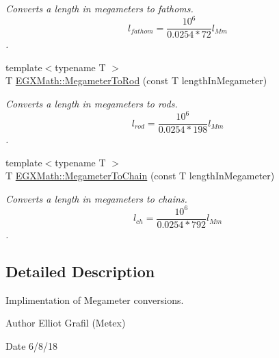 \begin{DoxyCompactItemize}
\begin{DoxyCompactList}\small\item\em Converts a length in megameters to fathoms. \[ l_{fathom}= \frac{10^{6}}{0.0254 * 72} l_{Mm} \]. \end{DoxyCompactList}\item 
{\footnotesize template$<$typename T $>$ }\\T \mbox{\hyperlink{group___e_g_x_math-_conversions-_length_conversions-_s_i-_megameter-_surveyors_ga46cf50c3f1310663facf0befbf3d71fb}{E\+G\+X\+Math\+::\+Megameter\+To\+Rod}} (const T length\+In\+Megameter)
\begin{DoxyCompactList}\small\item\em Converts a length in megameters to rods. \[ l_{rod}= \frac{10^{6}}{0.0254 * 198} l_{Mm} \]. \end{DoxyCompactList}\item 
{\footnotesize template$<$typename T $>$ }\\T \mbox{\hyperlink{group___e_g_x_math-_conversions-_length_conversions-_s_i-_megameter-_surveyors_ga7328b29fbeec6b35bf3b74f58d8bdfc0}{E\+G\+X\+Math\+::\+Megameter\+To\+Chain}} (const T length\+In\+Megameter)
\begin{DoxyCompactList}\small\item\em Converts a length in megameters to chains. \[ l_{ch}= \frac{10^{6}}{0.0254 * 792} l_{Mm} \]. \end{DoxyCompactList}\end{DoxyCompactItemize}


\subsection{Detailed Description}
Implimentation of Megameter conversions. 

\begin{DoxyAuthor}{Author}
Elliot Grafil (Metex) 
\end{DoxyAuthor}
\begin{DoxyDate}{Date}
6/8/18 
\end{DoxyDate}
